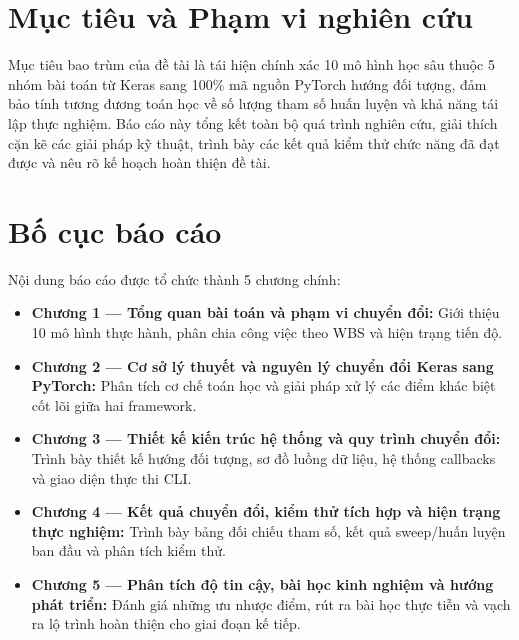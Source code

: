\section*{Mục tiêu và Phạm vi nghiên cứu}
Mục tiêu bao trùm của đề tài là tái hiện chính xác 10 mô hình học sâu thuộc 5 nhóm bài toán từ Keras sang 100\% mã nguồn PyTorch hướng đối tượng, đảm bảo tính tương đương toán học về số lượng tham số huấn luyện và khả năng tái lập thực nghiệm. Báo cáo này tổng kết toàn bộ quá trình nghiên cứu, giải thích cặn kẽ các giải pháp kỹ thuật, trình bày các kết quả kiểm thử chức năng đã đạt được và nêu rõ kế hoạch hoàn thiện đề tài.

\section*{Bố cục báo cáo}
Nội dung báo cáo được tổ chức thành 5 chương chính:
\begin{itemize}
\item \textbf{Chương 1 — Tổng quan bài toán và phạm vi chuyển đổi:} Giới thiệu 10 mô hình thực hành, phân chia công việc theo WBS và hiện trạng tiến độ.
\item \textbf{Chương 2 — Cơ sở lý thuyết và nguyên lý chuyển đổi Keras sang PyTorch:} Phân tích cơ chế toán học và giải pháp xử lý các điểm khác biệt cốt lõi giữa hai framework.
\item \textbf{Chương 3 — Thiết kế kiến trúc hệ thống và quy trình chuyển đổi:} Trình bày thiết kế hướng đối tượng, sơ đồ luồng dữ liệu, hệ thống callbacks và giao diện thực thi CLI.
\item \textbf{Chương 4 — Kết quả chuyển đổi, kiểm thử tích hợp và hiện trạng thực nghiệm:} Trình bày bảng đối chiếu tham số, kết quả sweep/huấn luyện ban đầu và phân tích kiểm thử.
\item \textbf{Chương 5 — Phân tích độ tin cậy, bài học kinh nghiệm và hướng phát triển:} Đánh giá những ưu nhược điểm, rút ra bài học thực tiễn và vạch ra lộ trình hoàn thiện cho giai đoạn kế tiếp.
\end{itemize}
